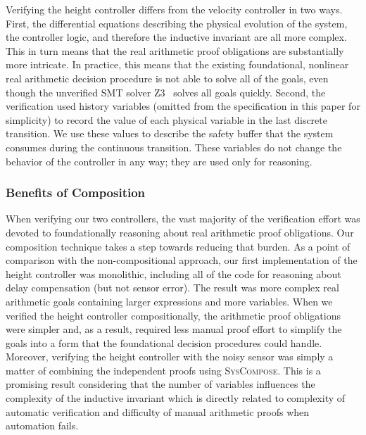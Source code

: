 Verifying the height controller differs from the velocity controller in two
ways.  First, the differential equations describing the physical evolution
of the system, the controller logic, and therefore the inductive invariant
are all more complex.  This in turn means that the real arithmetic proof
obligations are substantially more intricate.  In practice, this means that
the existing foundational, nonlinear real arithmetic decision procedure is
not able to solve all of the goals, even though the unverified SMT solver
Z3~\cite{demoura2008z3} solves all goals quickly.  Second, the verification
used history variables (omitted from the specification in this paper for
simplicity) to record the value of each physical variable in the last
discrete transition.  We use these values to describe the safety buffer
that the system consumes during the continuous transition.  These variables
do not change the behavior of the controller in any way; they are used only
for reasoning.

\subsubsection*{Benefits of Composition}
When verifying our two controllers, the vast majority of the verification
effort was devoted to foundationally reasoning about real arithmetic proof
obligations.  Our composition technique takes a step towards reducing that
burden.  As a point of comparison with the non-compositional approach, our
first implementation of the height controller was monolithic, including all
of the code for reasoning about delay compensation (but not sensor error).
The result was more complex real arithmetic goals containing larger
expressions and more variables.  When we verified the height controller
compositionally, the arithmetic proof obligations were simpler and, as a
result, required less manual proof effort to simplify the goals into a form
that the foundational decision procedures could handle.  Moreover,
verifying the height controller with the noisy sensor was simply a matter
of combining the independent proofs using \textsc{SysCompose}.  This is a
promising result considering that the number of variables influences the
complexity of the inductive invariant which is directly related to
complexity of automatic verification and difficulty of manual arithmetic
proofs when automation fails.

